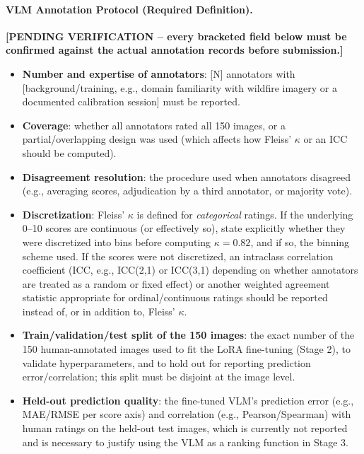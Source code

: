 \documentclass[journal]{IEEEtran}
\begin{document}
\paragraph{VLM Annotation Protocol (Required Definition).}
\label{sec:vlm_protocol}
\textbf{[PENDING VERIFICATION -- every bracketed field below must be
confirmed against the actual annotation records before submission.]}
\begin{itemize}
    \item \textbf{Number and expertise of annotators}: [N] annotators
    with [background/training, e.g., domain familiarity with wildfire
    imagery or a documented calibration session] must be reported.
    \item \textbf{Coverage}: whether all annotators rated all 150 images,
    or a partial/overlapping design was used (which affects how Fleiss'
    $\kappa$ or an ICC should be computed).
    \item \textbf{Disagreement resolution}: the procedure used when
    annotators disagreed (e.g., averaging scores, adjudication by a third
    annotator, or majority vote).
    \item \textbf{Discretization}: Fleiss' $\kappa$ is defined for
    \emph{categorical} ratings. If the underlying 0--10 scores are
    continuous (or effectively so), state explicitly whether they were
    discretized into bins before computing $\kappa=0.82$, and if so, the
    binning scheme used. If the scores were not discretized, an
    intraclass correlation coefficient (ICC, e.g., ICC(2,1) or ICC(3,1)
    depending on whether annotators are treated as a random or fixed
    effect) or another weighted agreement statistic appropriate for
    ordinal/continuous ratings should be reported instead of, or in
    addition to, Fleiss' $\kappa$.
    \item \textbf{Train/validation/test split of the 150 images}: the
    exact number of the 150 human-annotated images used to fit the LoRA
    fine-tuning (Stage 2), to validate hyperparameters, and to hold out
    for reporting prediction error/correlation; this split must be
    disjoint at the image level.
    \item \textbf{Held-out prediction quality}: the fine-tuned VLM's
    prediction error (e.g., MAE/RMSE per score axis) and correlation
    (e.g., Pearson/Spearman) with human ratings on the held-out test
    images, which is currently not reported and is necessary to justify
    using the VLM as a ranking function in Stage 3.
\end{itemize}
\end{document}
